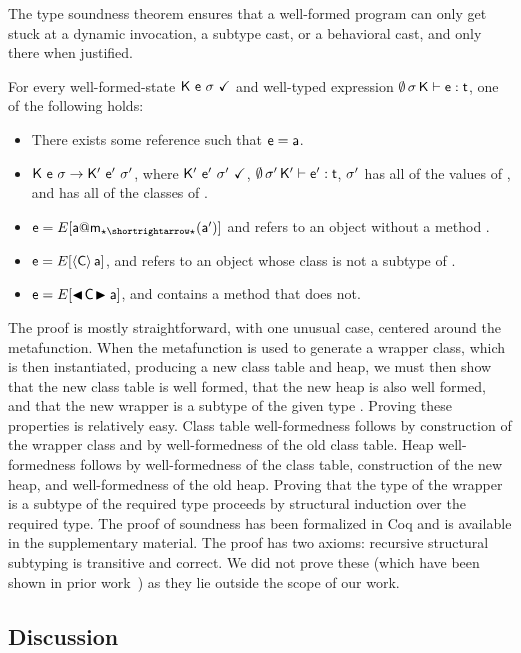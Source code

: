 \documentclass[USenglish]{tex/lipics-v2016}f
\begin{document}
The \kafka type soundness theorem ensures that a well-formed program can
only get stuck at a dynamic invocation, a subtype cast, or a behavioral
cast, and only there when justified.

\begin{theorem}

\noindent For every well-formed-state $\WFq{\K~\e~\s}$ and well-typed
expression $\EnvType\emptyset\s\K\e\t$, one of the following holds:

\begin{itemize}
\item There exists some reference \a such that $\e = \a$.
\item $\K~\e~\s\Red\Kp~\ep~\sp$, where $\WFq{\Kp~\ep~\sp}$,
  $\EnvType\emptyset\sp\Kp\ep\t$, $\sp$ has all of the values of \s, and \Kp
  has all of the classes of \K.
\item $\e=E[\DynCall\a\m\ap]$ and \a refers to an object without a method \m.
\item $\e=E[\SubCast\C\a]$, and \a refers to an object whose class is not
  a subtype of \C.
\item $\e=E[\BehCast\C\a]$, and \C contains a method that \a does not.
\end{itemize}
\end{theorem}

\noindent
The proof is mostly straightforward, with one unusual case, centered around
the  metafunction. When the  metafunction is used to
generate a wrapper class, which is then instantiated, producing a new class
table and heap, we must then show that the new class table is well formed,
that the new heap is also well formed, and that the new wrapper is a subtype
of the given type \C.  Proving these properties is relatively easy.  Class
table well-formedness follows by construction of the wrapper class and by
well-formedness of the old class table. Heap well-formedness follows by
well-formedness of the class table, construction of the new heap, and
well-formedness of the old heap.  Proving that the type of the wrapper is a
subtype of the required type proceeds by structural induction over the
required type.
The proof of soundness has been formalized in Coq and is available in the
supplementary material. The proof has two axioms: recursive structural
subtyping is transitive and correct. We did not prove these (which have been
shown in prior work~\cite{JonesStructural}) as they lie outside the scope of
our work.


\subsection{Discussion}
\end{document}
